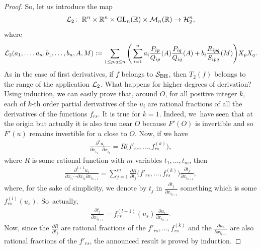 \documentclass[10pt,a4paper]{amsart}
\numberwithin{equation}{section}
\begin{document}
\begin{proof}
	So, let us introduce the map
\begin{gather*}
{\cal L}_2\colon\ \mathbb{R}^n\times\mathbb{R}^n\times {\rm GL}_n(\mathbb{R})\times {\cal M}_n(\mathbb{R})\to{\cal H}_2^n,
\end{gather*}
where
\begin{gather*}
{\cal L}_2(a_1, \dots, a_n, b_1, \dots, b_n, A,M):=\sum_{1\leq p,q\leq n}\Bigg(\sum_{i=1}^{n}a_i\frac{P_{ip}}{Q_{ip}}(A)\frac{P_{iq}}{Q_{iq}}(A) +b_i\frac{R_{ipq}}{S_{ipq}}(M)\Bigg)X_pX_q.
\end{gather*}
	As in the case of first derivatives, if $f$ belongs to ${\cal S}_{\rm BH}$, then $T_2(f)$ belongs to the range of the application ${\cal L}_2$.
	What happens for higher degrees of derivation? Using induction, we can easily prove that, around $O$, for all positive integer $k$, each of $k$-th order partial derivatives of the $u_i$ are rational fractions of all the derivatives of the functions $f_{rs}$. It is true for $k=1$. Indeed, we~have seen that at the origin but actually it is also true near $O$ because $F'(O)$ is invertible and so $F'(u)$ remains invertible for $u$ close to $O$. Now, if we have
\begin{gather*}
\frac{\partial^ku_i}{\partial x_{i_1}\cdots\partial{x_{i_k}}}=R\big(f'_{rs},\dots,f^{(k)}_{rs}\big),
\end{gather*}
where $R$ is some rational function with $m$ variables $t_1,\dots,t_m$, then
\begin{gather*}
\frac{\partial^{k+1}u_i}{\partial x_{i_1}\cdots\partial{x_{i_k}}\partial{x_{i_{k+1}}}}=\sum_{j=1}^m\frac{\partial R}{\partial t_j}\big(f'_{rs},\dots,f^{(k)}_{rs}\big)\frac{\partial t_j}{\partial x_{i_{k+1}}},
\end{gather*}
where, for the sake of simplicity, we denote by $t_j$ in $\frac{\partial t_j}{\partial x_{i_{k+1}}}$ something which is some $f^{(l)}_{rs}(u_s)$. So~actually,
\begin{gather*}
\frac{\partial t_j}{\partial x_{i_{k+1}}}=f^{(l+1)}_{rs}(u_s)\frac{\partial u_s}{\partial x_{i_{k+1}}}.
\end{gather*}
	Now, since the $\frac{\partial R}{\partial t_j}$ are rational fractions of the $f'_{rs},\dots,f^{(k)}_{rs}$ and the $\frac{\partial u_s}{\partial x_{i_{k+1}}}$ are also rational fractions of the $f'_{rs}$, the announced result is proved by induction.
	

\end{proof}
\end{document}
